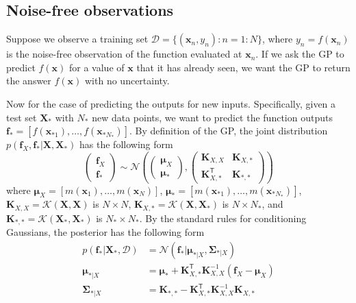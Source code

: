 \documentclass[11pt]{article}
\begin{document}
\subsection{Noise-free observations}
Suppose we observe a training set $\mathcal{D} = \{(\boldsymbol{x}_n, y_n) : n = 1:N\}$, where $y_n = f(\boldsymbol{x}_n)$ is the noise-free observation of the function evaluated at $\boldsymbol{x}_n$. 
If we ask the GP to predict $f(\boldsymbol{x})$ for a value of $\boldsymbol{x}$ that it has already seen, we want the GP to return the answer $f(\boldsymbol{x})$ with no uncertainty. 

Now for the case of predicting the outputs for new inputs. 
Specifically, given a test set $\mathbf{X}_*$ with $N_*$ new data points, we want to predict the function outputs $\boldsymbol{f}_* = [f(\boldsymbol{x}_{*1}), \ldots, f(\boldsymbol{x}_{*N_*})]$. By definition of the GP, the joint distribution $p(\boldsymbol{f}_X, \boldsymbol{f}_* | \mathbf{X}, \mathbf{X}_*)$ has the following form
\[
\begin{pmatrix} \boldsymbol{f}_X \\ \boldsymbol{f}_* \end{pmatrix} \sim \mathcal{N} \left( \begin{pmatrix} \boldsymbol{\mu}_X \\ \boldsymbol{\mu}_* \end{pmatrix}, \begin{pmatrix} \mathbf{K}_{X,X} & \mathbf{K}_{X,*} \\ \mathbf{K}_{X,*}^\mathsf{T} & \mathbf{K}_{*,*} \end{pmatrix} \right)
\]
where $\boldsymbol{\mu}_X = [m(\boldsymbol{x}_1), \ldots, m(\boldsymbol{x}_N)]$, $\boldsymbol{\mu}_* = [m(\boldsymbol{x}_{*1}), \ldots, m(\boldsymbol{x}_{*N_*})]$, $\mathbf{K}_{X,X} = \mathcal{K}(\mathbf{X}, \mathbf{X})$ is $N \times N$, $\mathbf{K}_{X,*} = \mathcal{K}(\mathbf{X}, \mathbf{X}_*)$ is $N \times N_*$, and $\mathbf{K}_{*,*} = \mathcal{K}(\mathbf{X}_*, \mathbf{X}_*)$ is $N_* \times N_*$. 
By the standard rules for conditioning Gaussians, the posterior has the following form
\[
\begin{aligned}
p(\boldsymbol{f}_* | \mathbf{X}_*, \mathcal{D}) &= \mathcal{N}(\boldsymbol{f}_* | \boldsymbol{\mu}_{*|X}, \boldsymbol{\Sigma}_{*|X}) \\
\boldsymbol{\mu}_{*|X} &= \boldsymbol{\mu}_* + \mathbf{K}_{X,*}^\mathsf{T} \mathbf{K}_{X,X}^{-1} (\boldsymbol{f}_X - \boldsymbol{\mu}_X) \\
\boldsymbol{\Sigma}_{*|X} &= \mathbf{K}_{*,*} - \mathbf{K}_{X,*}^\mathsf{T} \mathbf{K}_{X,X}^{-1} \mathbf{K}_{X,*}
\end{aligned}
\]
\end{document}
